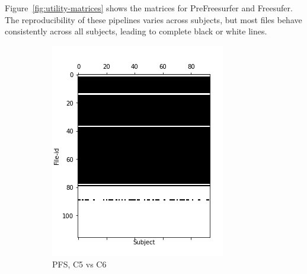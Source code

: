 \documentclass[10pt, conference, compsocconf]{IEEEtran}
\begin{document}
Figure~\ref{fig:utility-matrices} shows the matrices
for PreFreesurfer and Freesufer. The
reproducibility of these pipelines varies across subjects,
but most files behave
consistently across all subjects, leading to complete black or white
lines.

\begin{figure}[h!]
  \centering
  \begin{subfigure}[b]{0.45\columnwidth}
        \includegraphics[width=\columnwidth]{data/Utility_Matrix/PreFreeSurfer/PFS_5v6_utility_matrix.png}
  \caption{PFS, C5 vs C6}
  \end{subfigure}
  \begin{subfigure}[b]{0.45\columnwidth}

\end{subfigure}
\end{figure}
\end{document}
